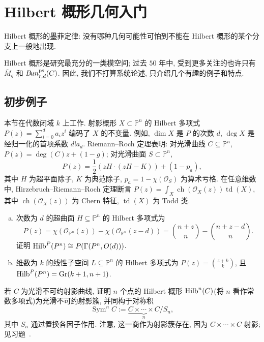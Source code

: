 \section{Hilbert 概形几何入门}\label{src:2.5}
\begin{epigraph}
Hilbert 概形的墨菲定律: 没有哪种几何可能性可怕到不能在 Hilbert 概形的某个分支上一般地出现.
\end{epigraph}
Hilbert 概形是研究最充分的一类模空间; 过去 $50$ 年中, 受到更多关注的也许只有 $\overline M_g$ 和 $B\!un_{r,d}^{\mathrm{ps}}(C)$.
因此, 我们不打算系统论述, 只介绍几个有趣的例子和特点.
\subsection{初步例子}\label{src:2.5.1-subsection}
本节在代数闭域 $k$ 上工作.
射影概形 $X\subset\mathbb P^n$ 的 Hilbert 多项式 $P(z)=\sum_{i=0}^da_iz^i$ 编码了 $X$ 的不变量.
例如, $\dim X$ 是 $P$ 的次数 $d$, $\deg X$ 是经归一化的首项系数 $d!a_d$.
Riemann--Roch 定理表明: 对光滑曲线 $C\subseteq\mathbb P^n$, $P(z)=\deg(C)z+(1-g)$; 对光滑曲面 $S\subset\mathbb P^n$, 
\[
P(z)=\frac12(zH\cdot(zH-K))+(1-p_a),
\]
其中 $H$ 为超平面除子, $K$ 为典范除子, $p_a=1-\chi(\mathcal O_S)$ 为算术亏格.
在任意维数中, Hirzebruch--Riemann--Roch 定理断言
$P(z)=\int_X\operatorname{ch}(\mathcal O_X(z))\operatorname{td}(X)$, 
其中 $\operatorname{ch}(\mathcal O_X(z))$ 为 Chern 特征, $\operatorname{td}(X)$ 为 Todd 类.
\begin{exercise}[超曲面与线性子空间]\label{src:2.5.1}
\begin{enumerate}[(a)]
\item 次数为 $d$ 的超曲面 $H\subseteq\mathbb P^n$ 的 Hilbert 多项式为
\[
P(z)=\chi(\mathcal O_{\mathbb P^n}(z))-\chi(\mathcal O_{\mathbb P^n}(z-d))
=\binom{n+z}{n}-\binom{n+z-d}{n}.
\]
证明 $\operatorname{Hilb}^P(P^n)\cong P(\Gamma(P^n,O(d)))$.
\item 维数为 $k$ 的线性子空间 $L\subseteq\mathbb P^n$ 的 Hilbert 多项式为 $P(z)=\binom{z+k}{k}$, 且 $\operatorname{Hilb}^P(P^n)=\operatorname{Gr}(k+1,n+1)$.
\end{enumerate}
\end{exercise}
\begin{example}\label{src:2.5.2}
若 $C$ 为光滑不可约射影曲线, 证明 $n$ 个点的 Hilbert 概形 $\operatorname{Hilb}^n(C)$(将 $n$ 看作常数多项式)为光滑不可约射影簇, 并同构于对称积
\[
\operatorname{Sym}^nC:=
\underbrace{C\times\cdots\times C}_{n}/S_n,
\]
其中 $S_n$ 通过置换各因子作用.
注意, 这一商作为射影簇存在, 因为 $C\times\cdots\times C$ 射影; 见习题~.
\end{example}
